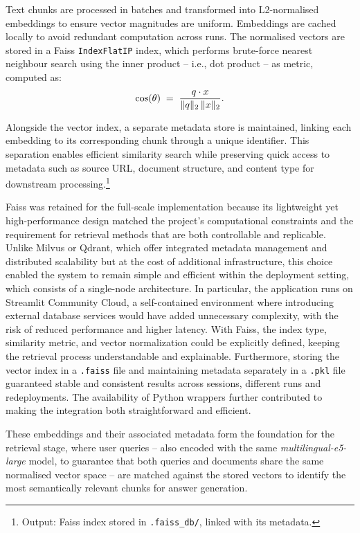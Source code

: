 \begin{spacing}{1.5}
Text chunks are processed in batches and transformed into L2-normalised embeddings to ensure vector magnitudes are uniform. Embeddings are cached locally to avoid redundant computation across runs. The normalised vectors are stored in a Faiss \texttt{IndexFlatIP} index, which performs brute-force nearest neighbour search using the inner product -- i.e., dot product -- as metric, computed as:
\[
\cos(\theta) \;=\; \frac{q \cdot x}{\|q\|_2 \, \|x\|_2}.\\
\]

Alongside the vector index, a separate metadata store is maintained, linking each embedding to its corresponding chunk through a unique identifier. This separation enables efficient similarity search while preserving quick access to metadata such as source URL, document structure, and content type for downstream processing.\footnote{Output: Faiss index stored in \texttt{.faiss\_db/}, linked with its metadata.}

Faiss was retained for the full-scale implementation because its lightweight yet high-performance design matched the project’s computational constraints and the requirement for retrieval methods that are both controllable and replicable. Unlike Milvus or Qdrant, which offer integrated metadata management and distributed scalability but at the cost of additional infrastructure, this choice enabled the system to remain simple and efficient within the deployment setting, which consists of a single-node architecture. In particular, the application runs on Streamlit Community Cloud, a self-contained environment where introducing external database services would have added unnecessary complexity, with the risk of reduced performance and higher latency. With Faiss, the index type, similarity metric, and vector normalization could be explicitly defined, keeping the retrieval process understandable and explainable. Furthermore, storing the vector index in a \texttt{.faiss} file and maintaining metadata separately in a \texttt{.pkl} file guaranteed stable and consistent results across sessions, different runs and redeployments. The availability of Python wrappers further contributed to making the integration both straightforward and efficient.

These embeddings and their associated metadata form the foundation for the retrieval stage, where user queries -- also encoded with the same \textit{multilingual-e5-large} model, to guarantee that both queries and documents share the same normalised vector space -- are matched against the stored vectors to identify the most semantically relevant chunks for answer generation.


\end{spacing}
